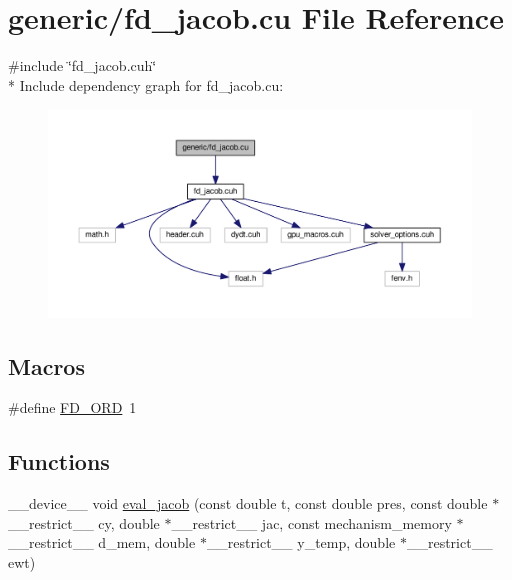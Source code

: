 \hypertarget{fd__jacob_8cu}{}\section{generic/fd\+\_\+jacob.cu File Reference}
\label{fd__jacob_8cu}
{\ttfamily \#include \char`\"{}fd\+\_\+jacob.\+cuh\char`\"{}}\\*
Include dependency graph for fd\+\_\+jacob.\+cu\+:\nopagebreak
\begin{figure}[H]
\begin{center}
\leavevmode
\includegraphics[width=350pt]{fd__jacob_8cu__incl}
\end{center}
\end{figure}
\subsection*{Macros}
\begin{DoxyCompactItemize}
\item 
\#define \hyperlink{fd__jacob_8cu_a5c00ed5d35f84424a9e4b2197bf21ac7}{F\+D\+\_\+\+O\+RD}~1
\end{DoxyCompactItemize}
\subsection*{Functions}
\begin{DoxyCompactItemize}
\item 
\+\_\+\+\_\+device\+\_\+\+\_\+ void \hyperlink{fd__jacob_8cu_ad1176739b8060ea7c37dc96b1b2d73c2}{eval\+\_\+jacob} (const double t, const double pres, const double $\ast$\+\_\+\+\_\+restrict\+\_\+\+\_\+ cy, double $\ast$\+\_\+\+\_\+restrict\+\_\+\+\_\+ jac, const mechanism\+\_\+memory $\ast$\+\_\+\+\_\+restrict\+\_\+\+\_\+ d\+\_\+mem, double $\ast$\+\_\+\+\_\+restrict\+\_\+\+\_\+ y\+\_\+temp, double $\ast$\+\_\+\+\_\+restrict\+\_\+\+\_\+ ewt)
\end{DoxyCompactItemize}


